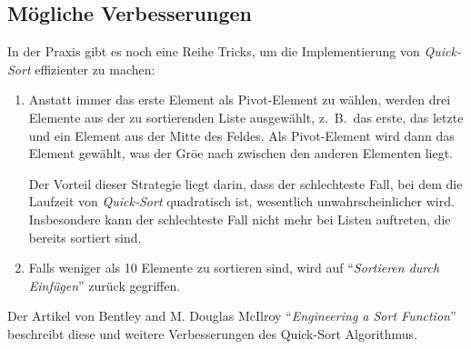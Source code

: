 \subsection{M\"ogliche Verbesserungen}
In der Praxis gibt es noch eine Reihe Tricks, um die Implementierung von \emph{Quick-Sort}
effizienter zu machen:
\begin{enumerate}
\item Anstatt immer das erste Element als Pivot-Element zu w\"ahlen,
      werden drei Elemente aus der zu sortierenden Liste ausgew\"ahlt,
      z.~B.~das erste, das letzte und ein Element aus der Mitte des Feldes.
      Als Pivot-Element wird dann das Element gew\"ahlt, was der Gr\"o\3e nach zwischen den
      anderen Elementen liegt.

      Der Vorteil dieser Strategie liegt darin, dass der schlechteste Fall, bei dem die Laufzeit
      von \emph{Quick-Sort} quadratisch ist, wesentlich unwahrscheinlicher wird.
      Insbesondere kann der schlechteste Fall nicht mehr bei Listen auftreten, die bereits
      sortiert sind.
\item Falls weniger als 10 Elemente zu sortieren sind, wird auf ``\emph{Sortieren durch Einf\"ugen}''
      zur\"uck gegriffen.
\end{enumerate}
Der Artikel von Bentley and M. Douglas McIlroy ``\emph{Engineering a Sort Function}''
\cite{bentley:93} beschreibt diese und weitere Verbesserungen des Quick-Sort Algorithmus. 

